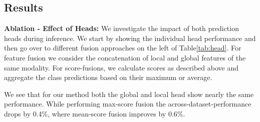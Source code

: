 \documentclass[runningheads]{llncs}
\begin{document}
\subsection{Results}
\noindent\textbf{Ablation - Effect of Heads:}
We investigate the impact of both prediction heads during inference. We start by showing the individual head performance and then go over to different fusion approaches on the left of Table\ref{tab:head}. For feature fusion we consider the concatenation of local and global features of the same modality. For score-fusions, we calculate scores as described above and aggregate the class predictions based on their maximum or average.

We see that for our method both the global and local head show nearly the same performance. While performing max-score fusion the across-dataset-performance drops by 0.4\%, where mean-score fusion improves by 0.6\%.
\end{document}
